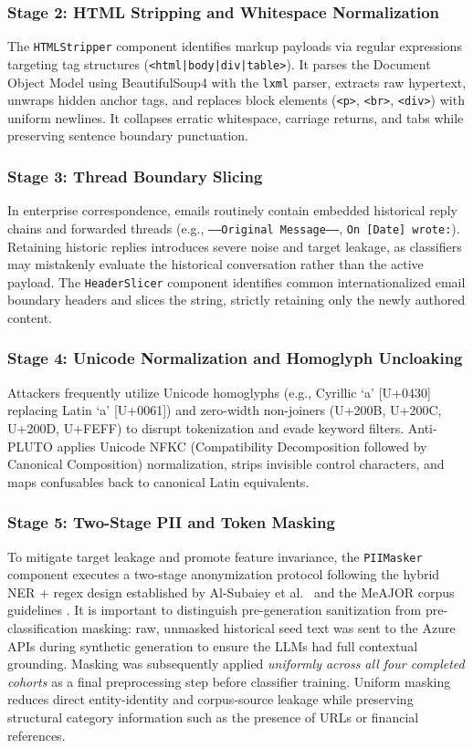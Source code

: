 \documentclass[journal]{IEEEtran}
\begin{document}
\subsubsection{Stage 2: HTML Stripping and Whitespace Normalization}
The \texttt{HTMLStripper} component identifies markup payloads via regular expressions targeting tag structures (\texttt{<html|body|div|table>}). It parses the Document Object Model using BeautifulSoup4 with the \texttt{lxml} parser, extracts raw hypertext, unwraps hidden anchor tags, and replaces block elements (\texttt{<p>}, \texttt{<br>}, \texttt{<div>}) with uniform newlines. It collapses erratic whitespace, carriage returns, and tabs while preserving sentence boundary punctuation.

\subsubsection{Stage 3: Thread Boundary Slicing}
In enterprise correspondence, emails routinely contain embedded historical reply chains and forwarded threads (e.g., \texttt{-----Original Message-----}, \texttt{On [Date] wrote:}). Retaining historic replies introduces severe noise and target leakage, as classifiers may mistakenly evaluate the historical conversation rather than the active payload. The \texttt{HeaderSlicer} component identifies common internationalized email boundary headers and slices the string, strictly retaining only the newly authored content.

\subsubsection{Stage 4: Unicode Normalization and Homoglyph Uncloaking}
Attackers frequently utilize Unicode homoglyphs (e.g., Cyrillic `a' [U+0430] replacing Latin `a' [U+0061]) and zero-width non-joiners (U+200B, U+200C, U+200D, U+FEFF) to disrupt tokenization and evade keyword filters. Anti-PLUTO applies Unicode NFKC (Compatibility Decomposition followed by Canonical Composition) normalization, strips invisible control characters, and maps confusables back to canonical Latin equivalents.

\subsubsection{Stage 5: Two-Stage PII and Token Masking}
To mitigate target leakage and promote feature invariance, the \texttt{PIIMasker} component executes a two-stage anonymization protocol following the hybrid NER + regex design established by Al-Subaiey et al.~\cite{alsubaiey2024spadr} and the MeAJOR corpus guidelines \cite{meajor2025corpus}. It is important to distinguish pre-generation sanitization from pre-classification masking: raw, unmasked historical seed text was sent to the Azure APIs during synthetic generation to ensure the LLMs had full contextual grounding. Masking was subsequently applied \emph{uniformly across all four completed cohorts} as a final preprocessing step before classifier training. Uniform masking reduces direct entity-identity and corpus-source leakage while preserving structural category information such as the presence of URLs or financial references.
\end{document}
